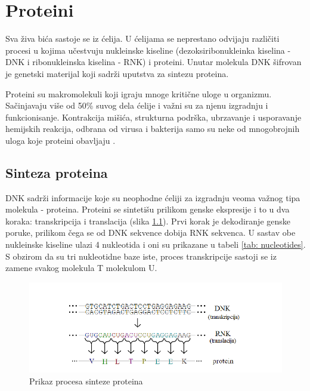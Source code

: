 \chapter{Proteini} %
\label{Chapter2}

Sva živa bića sastoje se iz ćelija. U ćelijama se neprestano odvijaju različiti procesi u kojima učestvuju nukleinske kiseline (dezoksiribonukleinka kiselina - DNK i ribonukleinska kiselina - RNK) i proteini. Unutar molekula DNK šifrovan je genetski materijal koji sadrži uputstva za sintezu proteina. 

Proteini su makromolekuli koji igraju mnoge kritične uloge u organizmu. Sačinjavaju više od 50\% suvog dela ćelije i važni su za njenu izgradnju i funkcionisanje. Kontrakcija mišića, strukturna podrška, ubrzavanje i usporavanje hemijskih reakcija, odbrana od virusa i bakterija samo su neke od mnogobrojnih uloga koje proteini obavljaju \cite{radivojac, doktJK}.


\section{Sinteza proteina}

DNK sadrži informacije koje su neophodne ćeliji za izgradnju veoma važnog tipa molekula - proteina. Proteini se sintetišu prilikom genske ekspresije i to u dva koraka: transkripcija i translacija (slika \ref{fig:synthesis}).  Prvi korak je dekodiranje genske poruke, prilikom čega se od DNK sekvence dobija RNK sekvenca. U sastav obe nukleinske kiseline ulazi 4 nukleotida i oni su prikazane u tabeli \ref{tab: nucleotides}. S obzirom da su tri nukleotidne baze iste, proces transkripcije sastoji se iz zamene svakog molekula T molekulom U. 


\begin{figure}[h]
	\centering
	\includegraphics[width=\textwidth]{Figures/protein_synthesis.png}
	\caption{Prikaz procesa sinteze proteina \cite{doktJK}}
	\label{fig:synthesis}
\end{figure}


